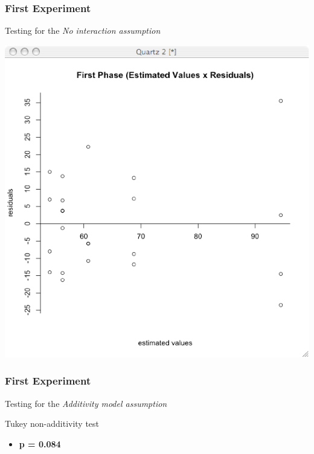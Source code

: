 \documentclass{beamer}
\begin{document}
\begin{frame}
\frametitle{First Experiment}
Testing for the \emph{No interaction assumption}
\begin{center}
 \includegraphics[scale=0.30]{images/fphase-interaction.eps}
\end{center}
\end{frame}

\begin{frame}
\frametitle{First Experiment}
Testing for the \emph{Additivity model assumption} 
\begin{block}{Tukey non-additivity test}
\begin{itemize} 
 \item {\bf p = 0.084}
\end{itemize} 
\end{block}
\end{frame}
\end{document}
